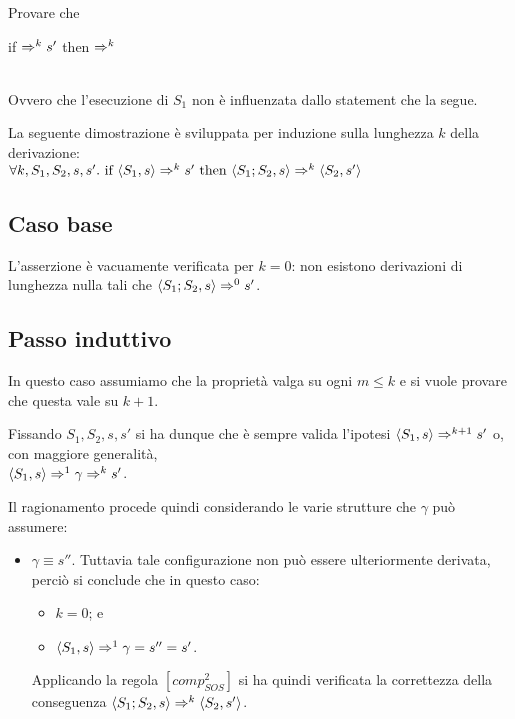{
  Provare che \\
  \centerline{if  $\Rightarrow^{k} s'$
  then  $\Rightarrow^{k}$ } \\
  Ovvero che l'esecuzione di $S_1$ non è influenzata dallo statement che la
  segue.
}
{
La seguente dimostrazione è sviluppata per induzione sulla lunghezza $k$ della
derivazione: \\

$\forall k,S_1,S_2,s,s'. \mbox{ if } \langle{}S_1, s\rangle{} \Rightarrow^{k} s' \mbox{ then }
           \langle{}S_1; S_2, s\rangle{} \Rightarrow^{k} \langle{}S_2, s'\rangle{}$

\subsection{Caso base}

L'asserzione è vacuamente verificata per $k = 0$: non esistono derivazioni di
lunghezza nulla tali che $\langle{}S_1; S_2, s\rangle{} \Rightarrow^{0} s'$.

\subsection{Passo induttivo}

In questo caso assumiamo che la proprietà valga su ogni $m \leq k$ e si vuole
provare che questa vale su $k + 1$.

Fissando $S_1, S_2, s, s'$ si ha dunque che è sempre valida l'ipotesi
$\langle{}S_1, s\rangle{} \Rightarrow^{k+1} s'$ o, con maggiore generalità, \\
$\langle{}S_1, s\rangle{} \Rightarrow^{1} \gamma{} \Rightarrow^{k} s'$.

Il ragionamento procede quindi considerando le varie strutture che $\gamma$ può
assumere:

\begin{itemize}
\item $\boxed{\gamma \equiv s''}$. Tuttavia tale configurazione non può essere
  ulteriormente derivata, perciò si conclude che in questo caso:
  \begin{itemize}
    \item $k = 0$; e
    \item $\langle{}S_1, s\rangle{} \Rightarrow^{1} \gamma{} = s'' = s'$.
  \end{itemize}

  Applicando la regola $[comp^2_{SOS}]$ si ha quindi verificata la correttezza
  della conseguenza $\langle{}S_1; S_2, s\rangle{} \Rightarrow^{k} \langle{}S_2, s'\rangle{}$.


\end{itemize}}
